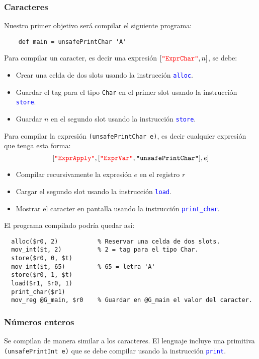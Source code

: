 \documentclass{article}
\newcommand{\fl}[1]{\texttt{#1}}
\newcommand{\astkw}[1]{\texttt{\textcolor{red}{"#1"}}}
\newcommand{\astid}[1]{\texttt{"#1"}}
\newcommand{\instruction}[1]{\texttt{\textcolor{blue}{#1}}}
\begin{document}
\subsubsection{Caracteres}

Nuestro primer objetivo será compilar el siguiente programa:
\begin{verbatim}
    def main = unsafePrintChar 'A'
\end{verbatim}

Para compilar un caracter, es decir una expresión $[\astkw{ExprChar}, n]$, se debe:
\begin{itemize}
\item Crear una celda de dos slots usando la instrucción \instruction{alloc}.
\item Guardar el tag para el tipo \fl{Char} en el primer slot usando la instrucción \instruction{store}.
\item Guardar $n$ en el segundo slot usando la instrucción \instruction{store}.
\end{itemize}

Para compilar la expresión \fl{(unsafePrintChar e)}, es decir
cualquier expresión que tenga esta forma:
\[
  [\astkw{ExprApply}, [\astkw{ExprVar}, \astid{unsafePrintChar}], e]
\]
\begin{itemize}
\item Compilar recursivamente la expresión $e$ en el registro $r$
\item Cargar el segundo slot usando la instrucción \instruction{load}.
\item Mostrar el caracter en pantalla usando la instrucción \instruction{print\_char}.
\end{itemize}
El programa compilado podría quedar así: 
\begin{verbatim}
  alloc($r0, 2)           % Reservar una celda de dos slots.
  mov_int($t, 2)          % 2 = tag para el tipo Char.
  store($r0, 0, $t)
  mov_int($t, 65)         % 65 = letra 'A'
  store($r0, 1, $t)
  load($r1, $r0, 1)
  print_char($r1)
  mov_reg @G_main, $r0    % Guardar en @G_main el valor del caracter.
\end{verbatim}

\subsubsection{Números enteros}

Se compilan de manera similar a los caracteres.
El lenguaje incluye una primitiva 
\fl{(unsafePrintInt e)}
que se debe compilar usando la instrucción \instruction{print}.
\end{document}
